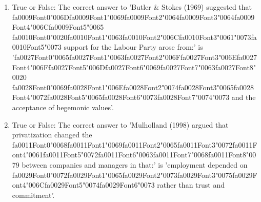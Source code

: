 \documentclass[12pt]{article}
\begin{document}
\begin{enumerate}[label=\arabic*.]
\item True or False: The correct answer to 'Butler \& Stokes (1969) suggested that {\csname fa0009Font0\endcsname\char"006D}{\csname fa0009Font1\endcsname\char"0069}{\csname fa0009Font2\endcsname\char"0064}{\csname fa0009Font3\endcsname\char"0064}{\csname fa0009Font4\endcsname\char"006C}{\csname fa0009Font5\endcsname\char"0065} {\csname fa0010Font0\endcsname\char"0020}{\csname fa0010Font1\endcsname\char"0063}{\csname fa0010Font2\endcsname\char"006C}{\csname fa0010Font3\endcsname\char"0061}{\char"0073}{\csname fa0010Font5\endcsname\char"0073} support for the Labour Party arose from:' is '{\csname fa0027Font0\endcsname\char"0065}{\csname fa0027Font1\endcsname\char"0063}{\csname fa0027Font2\endcsname\char"006F}{\csname fa0027Font3\endcsname\char"006E}{\csname fa0027Font4\endcsname\char"006F}{\csname fa0027Font5\endcsname\char"006D}{\csname fa0027Font6\endcsname\char"0069}{\csname fa0027Font7\endcsname\char"0063}{\csname fa0027Font8\endcsname\char"0020} {\csname fa0028Font0\endcsname\char"0069}{\csname fa0028Font1\endcsname\char"006E}{\csname fa0028Font2\endcsname\char"0074}{\csname fa0028Font3\endcsname\char"0065}{\csname fa0028Font4\endcsname\char"0072}{\csname fa0028Font5\endcsname\char"0065}{\csname fa0028Font6\endcsname\char"0073}{\csname fa0028Font7\endcsname\char"0074}{\char"0073} and the acceptance of hegemonic values'.
\item True or False: The correct answer to 'Mulholland (1998) argued that privatization changed the {\csname fa0011Font0\endcsname\char"0068}{\csname fa0011Font1\endcsname\char"0069}{\csname fa0011Font2\endcsname\char"0065}{\csname fa0011Font3\endcsname\char"0072}{\csname fa0011Font4\endcsname\char"0061}{\csname fa0011Font5\endcsname\char"0072}{\csname fa0011Font6\endcsname\char"0063}{\csname fa0011Font7\endcsname\char"0068}{\csname fa0011Font8\endcsname\char"0079} between companies and managers in that:' is 'employment depended on {\csname fa0029Font0\endcsname\char"0072}{\csname fa0029Font1\endcsname\char"0065}{\csname fa0029Font2\endcsname\char"0073}{\csname fa0029Font3\endcsname\char"0075}{\csname fa0029Font4\endcsname\char"006C}{\csname fa0029Font5\endcsname\char"0074}{\csname fa0029Font6\endcsname\char"0073} rather than trust and commitment'.

\end{enumerate}
\end{document}
